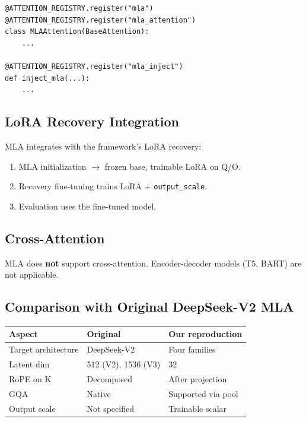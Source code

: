 \begin{lstlisting}
@ATTENTION_REGISTRY.register("mla")
@ATTENTION_REGISTRY.register("mla_attention")
class MLAAttention(BaseAttention):
    ...

@ATTENTION_REGISTRY.register("mla_inject")
def inject_mla(...):
    ...
\end{lstlisting}

\subsection{LoRA Recovery Integration}

MLA integrates with the framework's LoRA recovery:

\begin{enumerate}
\item MLA initialization $\to$ frozen base, trainable LoRA on Q/O.
\item Recovery fine-tuning trains LoRA + \texttt{output\_scale}.
\item Evaluation uses the fine-tuned model.

\end{enumerate}
\subsection{Cross-Attention}

MLA does \textbf{not} support cross-attention. Encoder-decoder models (T5, BART) 
are not applicable.

\subsection{Comparison with Original DeepSeek-V2 MLA}

\begin{table}[H]
\centering
\small
\begin{tabular}{lll}
\toprule
\textbf{Aspect} & \textbf{Original} & \textbf{Our reproduction} \\
\midrule
Target architecture & DeepSeek-V2 & Four families \\
Latent dim & 512 (V2), 1536 (V3) & 32 \\
RoPE on K & Decomposed & After projection \\
GQA & Native & Supported via pool \\
Output scale & Not specified & Trainable scalar \\
\bottomrule
\end{tabular}
\end{table}

